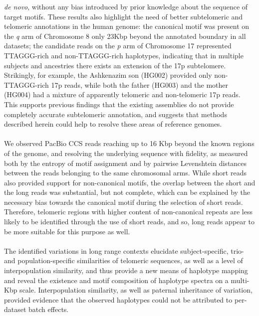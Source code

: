 \documentclass{article}
\begin{document}
            \textit{de novo}, without any bias introduced by prior knowledge about the sequence of target motifs.
    These results also highlight the need of better subtelomeric and telomeric annotations in the human genome:
        the canonical motif was present on the \textit{q} arm of Chromosome 8
            only 2\textendash{}3Kbp beyond the annotated boundary in all datasets;
        the candidate reads on the \textit{p} arm of Chromosome 17 represented TTAGGG-rich and non-TTAGGG-rich haplotypes,
            indicating that in multiple subjects and ancestries there exists an extension of the 17p subtelomere.
            Strikingly, for example, the Ashkenazim son (HG002) provided only non-TTAGGG-rich 17p reads, while both
            the father (HG003) and the mother (HG004) had a mixture of apparently telomeric and non-telomeric 17p reads.
    This supports previous findings \parencite{riethman2020}
            that the existing assemblies do not provide completely accurate subtelomeric annotation,
        and suggests that methods described herein could help to resolve these areas of reference genomes.
    \\~\\
    We observed PacBio CCS reads reaching up to 16 Kbp beyond the known regions of the genome,
        and resolving the underlying sequence with fidelity,
        as measured both by the entropy of motif assignment and by pairwise Levenshtein distances
            between the reads belonging to the same chromosomal arms.
    While short reads also provided support for non-canonical motifs,
        the overlap between the short and the long reads was substantial, but not complete,
        which can be explained by the necessary bias towards the canonical motif during the selection of short reads.
    Therefore, telomeric regions with higher content of non-canonical repeats are less likely to be identified through the use of short reads,
        and so, long reads appear to be more suitable for this purpose as well.
    \\~\\
    The identified variations in long range contexts elucidate
        subject-specific, trio- and population-specific similarities of telomeric sequences,
            as well as a level of interpopulation similarity,
        and thus provide a new means of haplotype mapping and reveal the existence and motif composition of haplotype spectra
            on a multi-Kbp scale.
    Interpopulation similarity, as well as paternal inheritance of variation,
        provided evidence that the observed haplotypes could not be attributed to per-dataset batch effects.
\end{document}
